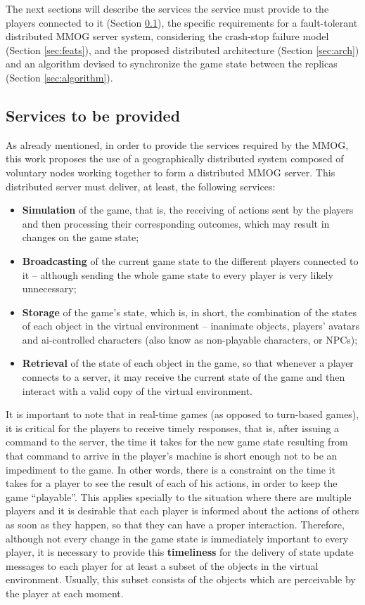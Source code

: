\documentclass[]{usiinfprospectus}
\begin{document}
The next sections will describe the services the service must provide to the players connected to it (Section \ref{sec:services}), the specific requirements for a fault-tolerant distributed MMOG server system, considering the crash-stop failure model (Section \ref{sec:feats}), and the proposed distributed architecture (Section \ref{sec:arch}) and an algorithm devised to synchronize the game state between the replicas (Section \ref{sec:algorithm}). 

\subsection{Services to be provided} \label{sec:services}

As already mentioned, in order to provide the services required by the MMOG, this work proposes the use of a geographically distributed system composed of voluntary nodes working together to form a distributed MMOG server. This distributed server must deliver, at least, the following services:

\begin{itemize}
	\item \textbf{Simulation} of the game, that is, the receiving of actions sent by the players and then processing their corresponding outcomes, which may result in changes on the game state;
	\item \textbf{Broadcasting} of the current game state to the different players connected to it -- although sending the whole game state to every player is very likely unnecessary;
	\item \textbf{Storage} of the game's state, which is, in short, the combination of the states of each object in the virtual environment -- inanimate objects, players' avatars and ai-controlled characters (also know as non-playable characters, or NPCs);
	\item \textbf{Retrieval} of the state of each object in the game, so that whenever a player connects to a server, it may receive the current state of the game and then interact with a valid copy of the virtual environment.
\end{itemize}

It is important to note that in real-time games (as opposed to turn-based games), it is critical for the players to receive timely responses, that is, after issuing a command to the server, the time it takes for the new game state resulting from that command to arrive in the player's machine is short enough not to be an impediment to the game. In other words, there is a constraint on the time it takes for a player to see the result of each of his actions, in order to keep the game ``playable''. This applies specially to the situation where there are multiple players and it is desirable that each player is informed about the actions of others as soon as they happen, so that they can have a proper interaction. Therefore, although not every change in the game state is immediately important to every player, it is necessary to provide this \textbf{timeliness} for the delivery of state update messages to each player for at least a subset of the objects in the virtual environment. Usually, this subset consists of the objects which are perceivable by the player at each moment.
\end{document}
